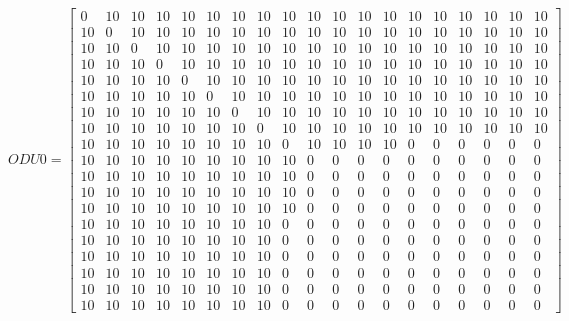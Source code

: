 \[
ODU0=
  \begin{bmatrix}
    0 & 10 & 10 & 10 & 10 & 10 & 10 & 10 & 10 & 10 & 10 & 10 & 10 & 10 & 10 & 10 & 10 & 10 & 10 \\
    10 & 0 & 10 & 10 & 10 & 10 & 10 & 10 & 10 & 10 & 10 & 10 & 10 & 10 & 10 & 10 & 10 & 10 & 10 \\
    10 & 10 & 0 & 10 & 10 & 10 & 10 & 10 & 10 & 10 & 10 & 10 & 10 & 10 & 10 & 10 & 10 & 10 & 10 \\
    10 & 10 & 10 & 0 & 10 & 10 & 10 & 10 & 10 & 10 & 10 & 10 & 10 & 10 & 10 & 10 & 10 & 10 & 10 \\
    10 & 10 & 10 & 10 & 0 & 10 & 10 & 10 & 10 & 10 & 10 & 10 & 10 & 10 & 10 & 10 & 10 & 10 & 10 \\
    10 & 10 & 10 & 10 & 10 & 0 & 10 & 10 & 10 & 10 & 10 & 10 & 10 & 10 & 10 & 10 & 10 & 10 & 10 \\
    10 & 10 & 10 & 10 & 10 & 10 & 0 & 10 & 10 & 10 & 10 & 10 & 10 & 10 & 10 & 10 & 10 & 10 & 10 \\
    10 & 10 & 10 & 10 & 10 & 10 & 10 & 0 & 10 & 10 & 10 & 10 & 10 & 10 & 10 & 10 & 10 & 10 & 10 \\
    10 & 10 & 10 & 10 & 10 & 10 & 10 & 10 & 0 & 10 & 10 & 10 & 10 & 0 & 0 & 0 & 0 & 0 & 0 \\
    10 & 10 & 10 & 10 & 10 & 10 & 10 & 10 & 10 & 0 & 0 & 0 & 0 & 0 & 0 & 0 & 0 & 0 & 0 \\
    10 & 10 & 10 & 10 & 10 & 10 & 10 & 10 & 10 & 0 & 0 & 0 & 0 & 0 & 0 & 0 & 0 & 0 & 0 \\
    10 & 10 & 10 & 10 & 10 & 10 & 10 & 10 & 10 & 0 & 0 & 0 & 0 & 0 & 0 & 0 & 0 & 0 & 0 \\
    10 & 10 & 10 & 10 & 10 & 10 & 10 & 10 & 10 & 0 & 0 & 0 & 0 & 0 & 0 & 0 & 0 & 0 & 0 \\
    10 & 10 & 10 & 10 & 10 & 10 & 10 & 10 & 0 & 0 & 0 & 0 & 0 & 0 & 0 & 0 & 0 & 0 & 0 \\
    10 & 10 & 10 & 10 & 10 & 10 & 10 & 10 & 0 & 0 & 0 & 0 & 0 & 0 & 0 & 0 & 0 & 0 & 0 \\
    10 & 10 & 10 & 10 & 10 & 10 & 10 & 10 & 0 & 0 & 0 & 0 & 0 & 0 & 0 & 0 & 0 & 0 & 0 \\
    10 & 10 & 10 & 10 & 10 & 10 & 10 & 10 & 0 & 0 & 0 & 0 & 0 & 0 & 0 & 0 & 0 & 0 & 0 \\
    10 & 10 & 10 & 10 & 10 & 10 & 10 & 10 & 0 & 0 & 0 & 0 & 0 & 0 & 0 & 0 & 0 & 0 & 0 \\
    10 & 10 & 10 & 10 & 10 & 10 & 10 & 10 & 0 & 0 & 0 & 0 & 0 & 0 & 0 & 0 & 0 & 0 & 0
  \end{bmatrix}
\]

